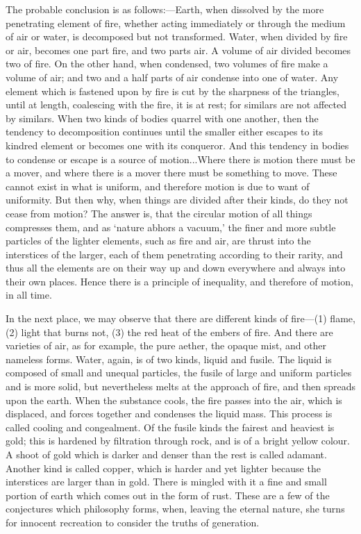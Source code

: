 \documentclass[11pt,letter]{article}
\begin{document}
\par  The probable conclusion is as follows:—Earth, when dissolved by the more penetrating element of fire, whether acting immediately or through the medium of air or water, is decomposed but not transformed. Water, when divided by fire or air, becomes one part fire, and two parts air. A volume of air divided becomes two of fire. On the other hand, when condensed, two volumes of fire make a volume of air; and two and a half parts of air condense into one of water. Any element which is fastened upon by fire is cut by the sharpness of the triangles, until at length, coalescing with the fire, it is at rest; for similars are not affected by similars. When two kinds of bodies quarrel with one another, then the tendency to decomposition continues until the smaller either escapes to its kindred element or becomes one with its conqueror. And this tendency in bodies to condense or escape is a source of motion...Where there is motion there must be a mover, and where there is a mover there must be something to move. These cannot exist in what is uniform, and therefore motion is due to want of uniformity. But then why, when things are divided after their kinds, do they not cease from motion? The answer is, that the circular motion of all things compresses them, and as ‘nature abhors a vacuum,’ the finer and more subtle particles of the lighter elements, such as fire and air, are thrust into the interstices of the larger, each of them penetrating according to their rarity, and thus all the elements are on their way up and down everywhere and always into their own places. Hence there is a principle of inequality, and therefore of motion, in all time.

\par  In the next place, we may observe that there are different kinds of fire—(1) flame, (2) light that burns not, (3) the red heat of the embers of fire. And there are varieties of air, as for example, the pure aether, the opaque mist, and other nameless forms. Water, again, is of two kinds, liquid and fusile. The liquid is composed of small and unequal particles, the fusile of large and uniform particles and is more solid, but nevertheless melts at the approach of fire, and then spreads upon the earth. When the substance cools, the fire passes into the air, which is displaced, and forces together and condenses the liquid mass. This process is called cooling and congealment. Of the fusile kinds the fairest and heaviest is gold; this is hardened by filtration through rock, and is of a bright yellow colour. A shoot of gold which is darker and denser than the rest is called adamant. Another kind is called copper, which is harder and yet lighter because the interstices are larger than in gold. There is mingled with it a fine and small portion of earth which comes out in the form of rust. These are a few of the conjectures which philosophy forms, when, leaving the eternal nature, she turns for innocent recreation to consider the truths of generation.
\end{document}
